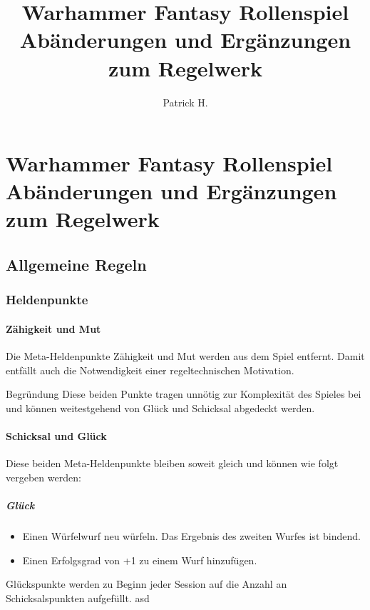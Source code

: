 \documentclass[a4paper,10pt,twoside,twocolumn,openany,nodeprecatedcode,bg=print]{dndbook}
\title{
  Warhammer Fantasy Rollenspiel\newline
  \large Abänderungen und Ergänzungen zum Regelwerk
  }
\author{Patrick H.}
\date{}
\begin{document}


\part*{Warhammer Fantasy Rollenspiel\newline
  \large{Abänderungen und Ergänzungen zum Regelwerk}\newline
}
\vspace{1em}



\chapter{Allgemeine Regeln}
\section{Heldenpunkte}
\subsection{Zähigkeit und Mut}
Die Meta-Heldenpunkte Zähigkeit und Mut werden aus dem Spiel entfernt.
Damit entfällt auch die Notwendigkeit einer regeltechnischen Motivation.

\begin{DndComment}{Begründung}
  Diese beiden Punkte tragen unnötig zur Komplexität des Spieles bei und können weitestgehend von Glück und Schicksal abgedeckt werden.
\end{DndComment}

\subsection{Schicksal und Glück}
Diese beiden Meta-Heldenpunkte bleiben soweit gleich und können wie folgt vergeben werden:
\subsubsection{Glück}
\begin{itemize}
  \item Einen Würfelwurf neu würfeln. Das Ergebnis des zweiten Wurfes ist bindend.
  \item Einen Erfolgsgrad von +1 zu einem Wurf hinzufügen.
\end{itemize}
Glückspunkte werden zu Beginn jeder Session auf die Anzahl an Schicksalspunkten aufgefüllt.
asd
\end{document}
